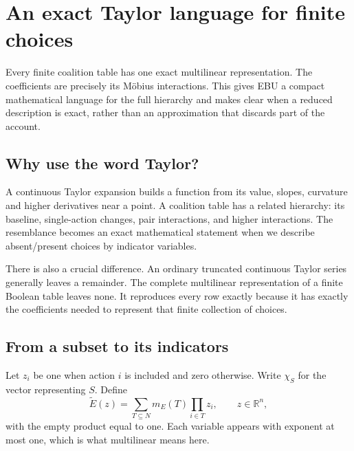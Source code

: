 \chapter{An exact Taylor language for finite choices}\label{ch:discrete-taylor}

Every finite coalition table has one exact multilinear representation. The coefficients are precisely its Möbius interactions. This gives EBU a compact mathematical language for the full hierarchy and makes clear when a reduced description is exact, rather than an approximation that discards part of the account.


\section{Why use the word Taylor?}
A continuous Taylor expansion builds a function from its value, slopes, curvature and higher derivatives near a point. A coalition table has a related hierarchy: its baseline, single-action changes, pair interactions, and higher interactions. The resemblance becomes an exact mathematical statement when we describe absent/present choices by indicator variables.

There is also a crucial difference. An ordinary truncated continuous Taylor series generally leaves a remainder. The complete multilinear representation of a finite Boolean table leaves none. It reproduces every row exactly because it has exactly the coefficients needed to represent that finite collection of choices.

\section{From a subset to its indicators}
Let $z_i$ be one when action $i$ is included and zero otherwise. Write $\chi_S$ for the vector representing $S$. Define
\begin{equation}\label{eq:multilinear}
 \widetilde E(z)=\sum_{T\subseteq N}m_E(T)\prod_{i\in T}z_i,
 \qquad z\in\mathbb R^n,
\end{equation}
with the empty product equal to one. Each variable appears with exponent at most one, which is what multilinear means here.

